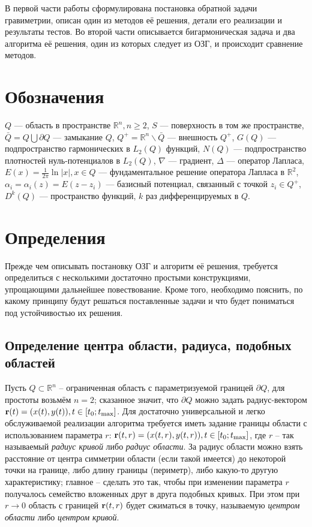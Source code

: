 \documentclass[a4paper]{article}
\newcommand{\R}[1]{\mathbb{R}^#1}
\begin{document}
В первой части работы сформулирована постановка обратной задачи гравиметрии, описан один из методов её решения,
детали его реализации и результаты тестов. Во второй части описывается бигармоническая задача и два алгоритма её решения, один из которых следует из ОЗГ, и происходит сравнение методов.

\section*{Обозначения}
$Q$ --- область в пространстве $\mathbb{R}^n, n\geq 2$, $S$ --- поверхность в том же пространстве,
$\bar Q = Q \bigcup \partial Q$ --- замыкание $Q$,
$Q^+= \R{n}\backslash \bar Q$ --- внешность $Q^+$,
$G(Q)$ --- подпространство гармонических в $L_2(Q)$ функций,
$N(Q)$ --- подпространство плотностей нуль-потенциалов в $L_2(Q)$,
$\nabla$ --- градиент,
$\Delta$ --- оператор Лапласа,
$E(x)= \frac{1}{2\pi}  \ln |x|, x \in Q$ --- фундаментальное решение оператора Лапласа в $\R{2}$,
$\alpha_i=\alpha_i(z)=E(z-z_i)$ --- базисный потенциал, связанный с точкой $z_i \in Q^+$,
$D^k(Q)$ --- пространство функций, $k$ раз дифференцируемых в $Q$.

\section{Определения}
Прежде чем описывать постановку ОЗГ и алгоритм её решения,
требуется определиться с несколькими достаточно простыми конструкциями,
упрощающими дальнейшее повествование.
Кроме того, необходимо пояснить, по какому принципу будут решаться поставленные задачи и что будет пониматься под устойчивостью их решения.
\subsection{Определение центра области, радиуса, подобных областей}
Пусть $Q \subset \R{n} $ -- ограниченная область с параметризуемой границей $\partial Q$, для простоты возьмём $n=2$;
сказанное значит, что $\partial Q$ можно задать радиус-вектором ${\bf r}(t)=(x(t),y(t)), t \in [t_0;t_{\max}]$.
Для достаточно универсальной и легко обслуживаемой реализации алгоритма требуется иметь задание границы области с использованием параметра $r$: ${\bf r}(t,r)=(x(t,r),y(t,r)), t \in [t_0;t_{\max}]$, где $r$ -- так называемый {\it радиус кривой} либо {\it радиус области}.
За радиус области можно взять расстояние от центра симметрии области (если такой имеется) до некоторой точки на границе, либо длину границы (периметр), либо какую-то другую характеристику;
главное -- сделать это так, чтобы при изменении параметра $r$ получалось семейство вложенных друг в друга подобных кривых. При этом при $r \rightarrow 0$ область с границей ${\bf r}(t,r)$ будет сжиматься в точку, называемую {\it центром области} либо {\it центром кривой}.
\end{document}
